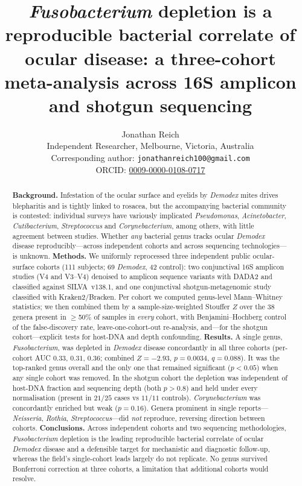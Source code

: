 \documentclass[11pt]{article}
\title{\textit{Fusobacterium} depletion is a reproducible bacterial correlate of
ocular \demodex{} disease: a three-cohort meta-analysis across 16S amplicon and
shotgun sequencing}
\author{Jonathan Reich \\
  {\small Independent Researcher, Melbourne, Victoria, Australia} \\
  {\small Corresponding author: \texttt{jonathanreich100@gmail.com}} \\
  {\small ORCID: \href{https://orcid.org/0009-0000-0108-0717}{0009-0000-0108-0717}}}
\date{}
\newcommand{\demodex}{\textit{Demodex}}
\begin{document}
\maketitle

\begin{abstract}
\textbf{Background.} Infestation of the ocular surface and eyelids by \demodex{}
mites drives blepharitis and is tightly linked to rosacea, but the accompanying
bacterial community is contested: individual surveys have variously implicated
\textit{Pseudomonas}, \textit{Acinetobacter}, \textit{Cutibacterium},
\textit{Streptococcus} and \textit{Corynebacterium}, among others, with little
agreement between studies. Whether
\emph{any} bacterial genus tracks ocular \demodex{} disease reproducibly---across
independent cohorts and across sequencing technologies---is unknown.
\textbf{Methods.} We uniformly reprocessed three independent public ocular-surface
cohorts (111 subjects; 69 \demodex{}, 42 control): two conjunctival 16S amplicon
studies (V4 and V3--V4) denoised to amplicon sequence variants with DADA2 and
classified against SILVA~v138.1, and one conjunctival shotgun-metagenomic study
classified with Kraken2/Bracken. Per cohort we computed genus-level
Mann--Whitney statistics; we then combined them by a sample-size-weighted
Stouffer $Z$ over the 38 genera present in $\ge$50\% of samples in \emph{every}
cohort, with Benjamini--Hochberg control of the false-discovery rate,
leave-one-cohort-out re-analysis, and---for the shotgun cohort---explicit tests
for host-DNA and depth confounding.
\textbf{Results.} A single genus, \textit{Fusobacterium}, was depleted in
\demodex{} disease concordantly in all three cohorts (per-cohort AUC $0.33$,
$0.31$, $0.36$; combined $Z=-2.93$, $p=0.0034$, $q=0.088$). It was the
top-ranked genus overall and the only one that remained significant
($p<0.05$) when any single cohort was removed. In the shotgun cohort the
depletion was independent of host-DNA fraction and sequencing depth (both
$p>0.8$) and held under every normalisation (present in $21/25$ cases vs
$11/11$ controls). \textit{Corynebacterium} was concordantly enriched but weak
($p=0.16$). Genera prominent in single reports---\textit{Neisseria},
\textit{Rothia}, \textit{Streptococcus}---did \emph{not} reproduce, reversing
direction between cohorts.
\textbf{Conclusions.} Across independent cohorts and two sequencing
methodologies, \textit{Fusobacterium} depletion is the leading reproducible
bacterial correlate of ocular \demodex{} disease and a defensible target for
mechanistic and diagnostic follow-up, whereas the field's single-cohort leads
largely do not replicate. No genus survived Bonferroni correction at three
cohorts, a limitation that additional cohorts would resolve.
\end{abstract}
\end{document}
